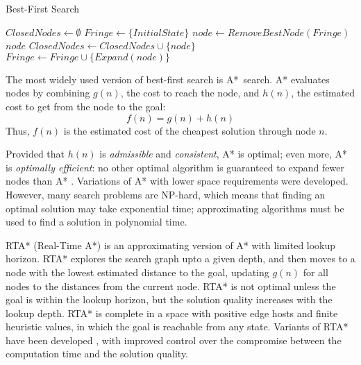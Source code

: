 \begin{algorithm}
\caption{Best-First Search}
\label{alg:bg-best-first-search}
\begin{algorithmic}[1]
\State $ClosedNodes \leftarrow \emptyset$
\State $Fringe \leftarrow \{InitialState\}$
\Loop
    \label{alg:bg-best-first-search-fringe-empty}
  \EndIf
  \State $node \leftarrow RemoveBestNode(Fringe)$
    \label{alg:bg-best-first-search-goal-reached}
    \Return $node$
  \EndIf
    \State $ClosedNodes \leftarrow ClosedNodes \cup \{node\}$ \label{alg:bg-best-first-search-remember-visited}
    \State $Fringe \leftarrow Fringe \cup \{Expand(node) \}$ \label{alg:bg-best-first-search-add-to-fringe}
  \EndIf
\EndLoop
\end{algorithmic}
\end{algorithm}

The most widely used version of best-first search is
A*~search. A* evaluates nodes by combining $g(n)$, the cost to
reach the node, and $h(n)$, the estimated cost to get from the node to the
goal:
\begin{equation}
\label{eq:a-star-heuristic}
f(n)=g(n)+h(n)
\end{equation}
Thus, $f(n)$ is the estimated cost of the cheapest solution through
node $n$.

Provided that $h(n)$ is {\em admissible} and {\em consistent}, A*
is optimal; even more, A* is {\em optimally efficient}: no
other optimal algorithm is guaranteed to expand fewer nodes than A*
\cite{Russell.aima}. Variations of A* with lower space requirements
were developed. However, many search problems are NP-hard, which
means that finding an optimal solution may take exponential time;
approximating algorithms must be used to find a solution in polynomial
time.

RTA* (Real-Time A*) \cite{Korf.rta} is an approximating version of A*
with limited lookup horizon. RTA* explores the search graph upto a
given depth, and then moves to a node with the lowest estimated
distance to the goal, updating $g(n)$ for all nodes to the distances
from the current node. RTA* is not optimal unless the goal is within
the lookup horizon, but the solution quality increases with  the
lookup depth. RTA* is complete in a space with positive edge hosts and
finite heuristic values, in which the goal is reachable from any state.
Variants of RTA* have been developed \cite{Russell.right},
\cite{Bulitko.dynamiccontrol}  with improved control over the
compromise between the computation time and the solution quality.

